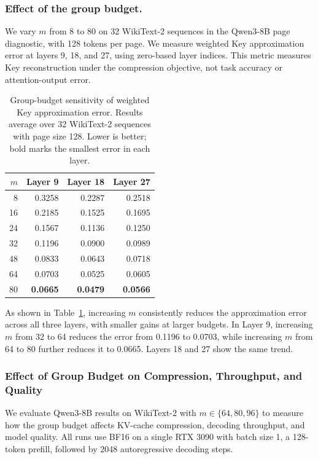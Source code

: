 \documentclass{article} %
\begin{document}
\subsubsection{Effect of the group budget.}
We vary $m$ from 8 to 80 on 32 WikiText-2 sequences in the Qwen3-8B page
diagnostic, with 128 tokens per page. We measure weighted Key approximation
error at layers 9, 18, and 27, using zero-based layer indices.
This metric measures Key reconstruction under the compression objective,
not task accuracy or attention-output error.

\begin{table}[H]
\centering
\caption{Group-budget sensitivity of weighted Key approximation error.
Results average over 32 WikiText-2 sequences with page size 128.
Lower is better; bold marks the smallest error in each layer.}
\label{tab:ablation-budget}
\small
\setlength{\tabcolsep}{9pt}
\begin{tabular}{rrrr}
\toprule
$m$ & Layer 9 & Layer 18 & Layer 27 \\
\midrule
8  & 0.3258 & 0.2287 & 0.2518 \\
16 & 0.2185 & 0.1525 & 0.1695 \\
24 & 0.1567 & 0.1136 & 0.1250 \\
32 & 0.1196 & 0.0900 & 0.0989 \\
48 & 0.0833 & 0.0643 & 0.0718 \\
64 & 0.0703 & 0.0525 & 0.0605 \\
80 & \textbf{0.0665} & \textbf{0.0479} & \textbf{0.0566} \\
\bottomrule
\end{tabular}
\end{table}

As shown in Table~\ref{tab:ablation-budget}, increasing $m$ consistently reduces
the approximation error across all three layers, with smaller gains at larger
budgets. In Layer 9, increasing $m$ from 32 to 64 reduces the error from
0.1196 to 0.0703, while increasing $m$ from 64 to 80 further reduces it to
0.0665. Layers 18 and 27 show the same trend. 

\subsubsection{Effect of Group Budget on Compression, Throughput, and Quality}
We evaluate Qwen3-8B results on WikiText-2 with
$m\in\{64,80,96\}$ to measure how the group budget affects KV-cache
compression, decoding throughput, and model quality. All runs use BF16 on a
single RTX 3090 with batch size 1, a 128-token prefill, followed by 2048
autoregressive decoding steps.
\end{document}
